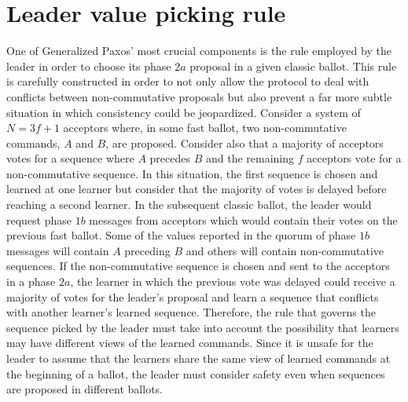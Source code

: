 \section{Leader value picking rule} \label{value_picking}

One of Generalized Paxos' most crucial components is the rule employed by the leader in order to choose its phase $2a$ proposal in a given classic ballot. This rule is carefully constructed in order to not only allow the protocol to deal with conflicts between non-commutative proposals but also prevent a far more subtle situation in which consistency could be jeopardized. Consider a system of $N=3f+1$ acceptors where, in some fast ballot, two non-commutative commands, $A$ and $B$, are proposed. Consider also that a majority of acceptors votes for a sequence where $A$ precedes $B$ and the remaining $f$ acceptors vote for a non-commutative sequence. In this situation, the first sequence is chosen and learned at one learner but consider that the majority of votes is delayed before reaching a second learner. In the subsequent classic ballot, the leader would request phase $1b$ messages from acceptors which would contain their votes on the previous fast ballot. Some of the values reported in the quorum of phase $1b$ messages will contain $A$ preceding $B$ and others will contain non-commutative sequences. If the non-commutative sequence is chosen and sent to the acceptors in a phase $2a$, the learner in which the previous vote was delayed could receive a majority of votes for the leader's proposal and learn a sequence that conflicts with another learner's learned sequence. Therefore, the rule that governs the sequence picked by the leader must take into account the possibility that learners may have different views of the learned commands. Since it is unsafe for the leader to assume that the learners share the same view of learned commands at the beginning of a ballot, the leader must consider safety even when sequences are proposed in different ballots. \par

